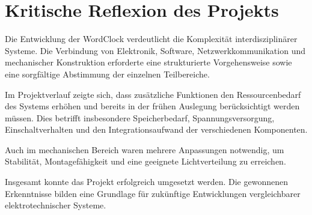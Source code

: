 \section{Kritische Reflexion des Projekts}
Die Entwicklung der WordClock verdeutlicht die Komplexität interdisziplinärer Systeme.  
Die Verbindung von Elektronik, Software, Netzwerkkommunikation und mechanischer Konstruktion erforderte eine strukturierte Vorgehensweise sowie eine sorgfältige Abstimmung der einzelnen Teilbereiche.  

Im Projektverlauf zeigte sich, dass zusätzliche Funktionen den Ressourcenbedarf des Systems erhöhen und bereits in der frühen Auslegung berücksichtigt werden müssen.  
Dies betrifft insbesondere Speicherbedarf, Spannungsversorgung, Einschaltverhalten und den Integrationsaufwand der verschiedenen Komponenten.  

Auch im mechanischen Bereich waren mehrere Anpassungen notwendig, um Stabilität, Montagefähigkeit und eine geeignete Lichtverteilung zu erreichen.  

Insgesamt konnte das Projekt erfolgreich umgesetzt werden.  
Die gewonnenen Erkenntnisse bilden eine Grundlage für zukünftige Entwicklungen vergleichbarer elektrotechnischer Systeme.